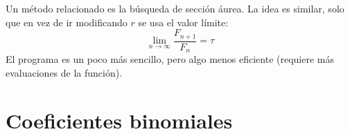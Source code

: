   Un método relacionado es la búsqueda de sección áurea.%
  La idea es similar,
  solo que en vez de ir modificando \(r\) se usa el valor límite:
  \begin{equation*}
    \lim_{n \rightarrow \infty} \frac{F_{n + 1}}{F_n}
      = \tau
  \end{equation*}
  El programa es un poco más sencillo,
  pero algo menos eficiente
  (requiere más evaluaciones de la función).

\section{Coeficientes binomiales}
\label{sec:coeficientes-binomiales}


